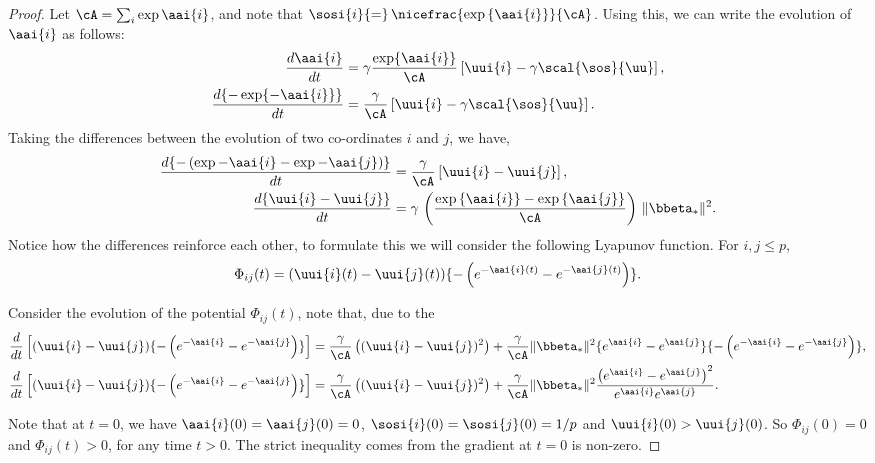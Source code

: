 \documentclass{article}
\theoremstyle{plain}
\theoremstyle{definition}
\theoremstyle{remark}
\begin{document}
\NoCrossingLogistic*
\begin{proof}
    Let $     \cA = \sum_{i} \exp{\aai{i}} $, and note that $\sosi{i}{=} \, \nicefrac{\exp{\{\aai{i}\}}}{\cA}$. Using this, we can write the evolution of $\aai{i}$ as follows:
\begin{align*}
    \frac{d\aai{i}}{dt} &=  \gamma \frac{\exp\{\aai{i}\}}{\cA}  \left[ \uui{i} - \gamma \scal{\sos}{\uu} \right], \\
    \frac{d\{ {-} \exp\{{-\aai{i}} \}\}}{dt} &=   \frac{\gamma }{\cA}  \left[ \uui{i} - \gamma \scal{\sos}{\uu} \right].
\end{align*}
Taking the differences between the evolution of two co-ordinates $i$ and $j$, we have,
\begin{align*}
    \frac{d \{ {-}\left( \exp{-\aai{i}} - \exp{-\aai{j}} \right) \}}{dt} &=   \frac{\gamma }{\cA}  \left[ \uui{i} - \uui{j} \right], \\
    \frac{ d \{ \uui{i} - \uui{j} \} }{ d t} &=  \gamma \, \left( \frac{\exp{\{\aai{i}\}} - \exp{\{\aai{j}\}}}{\cA} \right) \, \| \bbeta_* \|^2. 
\end{align*}
Notice how the differences reinforce each other, to formulate this we will consider the following Lyapunov function. For $i,j \leq p$,
\begin{align*}
    \Phi_{ij}(t) = (\uui{i}(t) - \uui{j}(t)) \{ {-}\left( e^{-\aai{i}(t)} - e^{-\aai{j}(t)} \right) \}.
\end{align*}

Consider the evolution of the potential $\Phi_{ij}(t)$, note that, due to the  
\begin{align*}
    \frac{d}{dt} \left[ (\uui{i} - \uui{j}) \{ {-}\left( e^{-\aai{i}} - e^{-\aai{j}} \right) \}  \right] &= \frac{\gamma}{\cA} \left( (\uui{i} - \uui{j})^2 \right) + \frac{\gamma}{\cA} \| \bbeta_* \|^2 \{e^{\aai{i}} - e^{\aai{j}}\} \{ {-}\left( e^{-\aai{i}} - e^{-\aai{j}} \right) \},  \\
    \frac{d}{dt} \left[ (\uui{i} - \uui{j}) \{ {-}\left( e^{-\aai{i}} - e^{-\aai{j}} \right) \}  \right] &= \frac{\gamma}{\cA} \left( (\uui{i} - \uui{j})^2 \right)
     + \frac{\gamma}{\cA} \| \bbeta_* \|^2 \frac{ \left(e^{\aai{i}} - e^{\aai{j}} \right)^2 }{e^{\aai{i}} e^{\aai{j}} }.
\end{align*}

    Note that at $t=0$, we have $\aai{i}(0) = \aai{j}(0) = 0$, $\sosi{i}(0) = \sosi{j}(0) = {1}/{p}$ and $\uui{i}(0) > \uui{j}(0)$. So $\Phi_{ij}(0) = 0$ and $\Phi_{ij}(t) > 0$, for any time $t > 0$. The strict inequality comes from the gradient at $t{=}0$ is non-zero. 


\end{proof}
\end{document}
